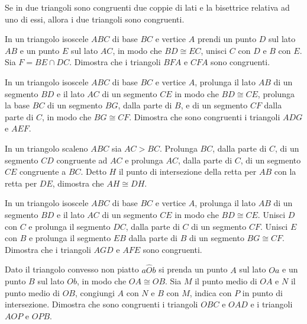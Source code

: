 \begin{multicols}{2}
\begin{esercizio}
Se in due triangoli sono congruenti due coppie di lati e la 
bisettrice relativa ad uno di essi, allora i due triangoli sono 
congruenti.
\end{esercizio}

\begin{esercizio}
In un triangolo isoscele \(ABC\) di base \(BC\) e vertice \(A\) prendi un 
punto \(D\) sul lato \(AB\) e un punto \(E\) sul lato \(AC\), in modo che 
\(BD\cong EC\), unisci \(C\) con \(D\) e \(B\) con \(E\). Sia \(F=BE\cap 
DC\). 
Dimostra che i triangoli \(BFA\) e \(CFA\) sono congruenti.
\end{esercizio}

\begin{esercizio}
In un triangolo isoscele \(ABC\) di base \(BC\) e vertice \(A\), prolunga 
il lato \(AB\) di un segmento \(BD\) e il lato \(AC\) di un segmento \(CE\) 
in modo che \(BD\cong CE\), prolunga la base \(BC\) di un segmento \(BG\), 
dalla parte di \(B\), e di un segmento \(CF\) dalla parte di \(C\), in modo 
che \(BG\cong CF\). Dimostra che sono congruenti i triangoli \(ADG\) e 
\(AEF\).
\end{esercizio}

\begin{esercizio}
In un triangolo scaleno \(ABC\) sia \(AC>BC\). Prolunga \(BC\), dalla parte 
di \(C\), di un segmento \(CD\) congruente ad \(AC\) e prolunga \(AC\), dalla 
parte di \(C\), di un segmento \(CE\) congruente a \(BC\). Detto \(H\) il 
punto di intersezione della retta per \(AB\) con la retta per \(DE\), 
dimostra che \(AH\cong DH\).
\end{esercizio}

\begin{esercizio}
In un triangolo isoscele \(ABC\) di base \(BC\) e vertice \(A\), prolunga 
il lato \(AB\) di un segmento \(BD\) e il lato \(AC\) di un segmento \(CE\) 
in modo che \(BD\cong CE\). Unisci \(D\) con \(C\) e prolunga il segmento 
\(DC\), dalla parte di \(C\) di un segmento \(CF\). Unisci \(E\) con \(B\) e 
prolunga il segmento \(EB\) dalla parte di \(B\) di un segmento \(BG\cong 
CF\). Dimostra che i triangoli \(AGD\) e \(AFE\) sono congruenti.
\end{esercizio}

\begin{esercizio}
Dato il triangolo convesso non piatto \(a\widehat{O}b\) si prenda un 
punto \(A\) sul lato \(Oa\) e un punto \(B\) sul lato \(Ob\), in modo che 
\(OA\cong OB\). Sia \(M\) il punto medio di \(OA\) e \(N\) il punto medio di 
\(OB\), congiungi \(A\) con \(N\) e \(B\) con \(M\), indica con \(P\) in punto 
di 
intersezione. Dimostra che sono congruenti i triangoli \(OBC\) e \(OAD\) 
e i triangoli \(AOP\) e \(OPB\).
\end{esercizio}


\end{multicols}

